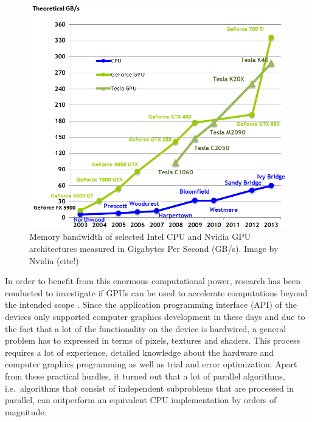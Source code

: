 \begin{figure}
\centering
\includegraphics[width=\textwidth, trim = 0mm 0mm 0mm 10mm, clip]{images/memory-bandwidth.png}
\caption{Memory bandwidth of selected Intel CPU and Nvidia GPU architectures measured in Gigabytes Per Second (GB/s). Image by Nvidia (cite!)}
\label{fig:memorybandw}
\end{figure}

In order to benefit from this enormous computational power, research has been conducted to investigate if GPUs can be used to accelerate computations beyond the intended scope \cite{harris_physically-based_2002, owens_gpus_2004}. Since the application programming interface (API) of the devices only supported computer graphics development in these days and due to the fact that a lot of the functionality on the device is hardwired, a general problem has to expressed in terms of pixels, textures and shaders. This process requires a lot of experience, detailed knowledge about the hardware and computer graphics programming as well as trial and error optimization. Apart from these practical hurdles, it turned out that a lot of parallel algorithms, i.e.\ algorithms that consist of independent subproblems that are processed in parallel, can outperform an equivalent CPU implementation by orders of magnitude. 

